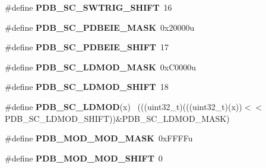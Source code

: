 \begin{DoxyCompactItemize}
\item 
\hypertarget{group___p_d_b___register___masks_ga494cf2eed3e90d588c9d6a79cdb5aaaa}{}\#define {\bfseries P\+D\+B\+\_\+\+S\+C\+\_\+\+S\+W\+T\+R\+I\+G\+\_\+\+S\+H\+I\+F\+T}~16\label{group___p_d_b___register___masks_ga494cf2eed3e90d588c9d6a79cdb5aaaa}

\item 
\hypertarget{group___p_d_b___register___masks_gadad9b8b56988b977ed415ab18985f9dc}{}\#define {\bfseries P\+D\+B\+\_\+\+S\+C\+\_\+\+P\+D\+B\+E\+I\+E\+\_\+\+M\+A\+S\+K}~0x20000u\label{group___p_d_b___register___masks_gadad9b8b56988b977ed415ab18985f9dc}

\item 
\hypertarget{group___p_d_b___register___masks_gaa64d610e568a9cafe7d2110a76daf8df}{}\#define {\bfseries P\+D\+B\+\_\+\+S\+C\+\_\+\+P\+D\+B\+E\+I\+E\+\_\+\+S\+H\+I\+F\+T}~17\label{group___p_d_b___register___masks_gaa64d610e568a9cafe7d2110a76daf8df}

\item 
\hypertarget{group___p_d_b___register___masks_ga78d77e651e5cc9a5ddeb63fa6ac627af}{}\#define {\bfseries P\+D\+B\+\_\+\+S\+C\+\_\+\+L\+D\+M\+O\+D\+\_\+\+M\+A\+S\+K}~0x\+C0000u\label{group___p_d_b___register___masks_ga78d77e651e5cc9a5ddeb63fa6ac627af}

\item 
\hypertarget{group___p_d_b___register___masks_ga53a8856bc6371ac178123477526e8249}{}\#define {\bfseries P\+D\+B\+\_\+\+S\+C\+\_\+\+L\+D\+M\+O\+D\+\_\+\+S\+H\+I\+F\+T}~18\label{group___p_d_b___register___masks_ga53a8856bc6371ac178123477526e8249}

\item 
\hypertarget{group___p_d_b___register___masks_ga53f46e26b4a7cc5b74fa449687227baf}{}\#define {\bfseries P\+D\+B\+\_\+\+S\+C\+\_\+\+L\+D\+M\+O\+D}(x)                                                ~(((uint32\+\_\+t)(((uint32\+\_\+t)(x))$<$$<$P\+D\+B\+\_\+\+S\+C\+\_\+\+L\+D\+M\+O\+D\+\_\+\+S\+H\+I\+F\+T))\&P\+D\+B\+\_\+\+S\+C\+\_\+\+L\+D\+M\+O\+D\+\_\+\+M\+A\+S\+K)\label{group___p_d_b___register___masks_ga53f46e26b4a7cc5b74fa449687227baf}

\item 
\hypertarget{group___p_d_b___register___masks_ga9dddc13b37ba4e27c8401dfa56b2173f}{}\#define {\bfseries P\+D\+B\+\_\+\+M\+O\+D\+\_\+\+M\+O\+D\+\_\+\+M\+A\+S\+K}~0x\+F\+F\+F\+Fu\label{group___p_d_b___register___masks_ga9dddc13b37ba4e27c8401dfa56b2173f}

\item 
\hypertarget{group___p_d_b___register___masks_gaf224ebff31aea3bd5318f078eccf060e}{}\#define {\bfseries P\+D\+B\+\_\+\+M\+O\+D\+\_\+\+M\+O\+D\+\_\+\+S\+H\+I\+F\+T}~0\label{group___p_d_b___register___masks_gaf224ebff31aea3bd5318f078eccf060e}


\end{DoxyCompactItemize}
